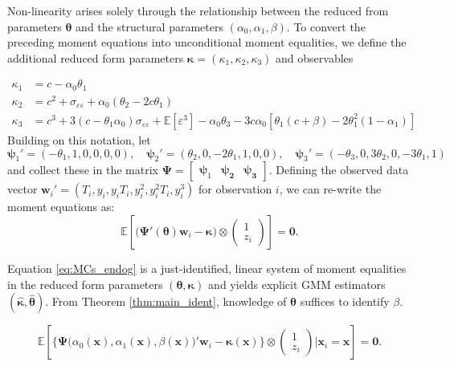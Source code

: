 Non-linearity arises solely through the relationship between the reduced from parameters $\boldsymbol{\theta}$ and the structural parameters $(\alpha_0, \alpha_1, \beta)$.
To convert the preceding moment equations into unconditional moment equalities, we define the additional reduced form parameters $\boldsymbol{\kappa} = (\kappa_1, \kappa_2, \kappa_3)$ and observables 

\begin{align*}
\kappa_1 &= c - \alpha_0 \theta_1\\
  \kappa_2 &= c^2 + \sigma_{\varepsilon\varepsilon} + \alpha_0 (\theta_2 - 2c \theta_1)\\
  \kappa_3 &= c^3 + 3\left( c - \theta_1 \alpha_0 \right) \sigma_{\varepsilon\varepsilon} + \mathbb{E}[\varepsilon^3] - \alpha_0 \theta_3 - 3 c \alpha_0 \left[ \theta_1 \left( c + \beta \right) - 2\theta_1^2 (1 - \alpha_1) \right]
\end{align*}
Building on this notation, let
\begin{equation}
  \boldsymbol{\psi}_1' = (-\theta_1, 1, 0, 0, 0, 0), \quad
  \boldsymbol{\psi}_2' = (\theta_2, 0, -2\theta_1, 1, 0, 0), \quad
  \boldsymbol{\psi}_3' = (-\theta_3, 0, 3\theta_2, 0, -3\theta_1, 1)
\end{equation}
and collect these in the matrix
$\boldsymbol{\Psi} = \left[
  \begin{array}{ccc}
    \boldsymbol{\psi}_1 & \boldsymbol{\psi_2} & \boldsymbol{\psi_3}
\end{array}\right]$.
Defining the observed data vector $\mathbf{w}_i' = (T_i, y_i, y_iT_i, y_i^2, y_i^2 T_i, y_i^3)$ for observation $i$, we can re-write the moment equations as:
\begin{equation}
\mathbb{E}\left[
  \big(\boldsymbol{\Psi}'(\boldsymbol{\theta})\mathbf{w}_i - \boldsymbol{\kappa}\big) \otimes 
\left(
\begin{array}{c}
  1 \\ z_i
\end{array}\right)
\right] = \mathbf{0}.
\end{equation}

Equation \ref{eq:MCs_endog} is a just-identified, linear system of moment equalities in the reduced form parameters $(\boldsymbol{\theta},\boldsymbol{\kappa})$ and yields explicit GMM estimators $(\widehat{\boldsymbol{\kappa}},\widehat{\boldsymbol{\theta}})$.
From Theorem \ref{thm:main_ident}, knowledge of $\boldsymbol{\theta}$ suffices to identify $\beta$.

\begin{equation}
\mathbb{E}\left[
  \bigg\{\boldsymbol{\Psi}\big(\alpha_0(\mathbf{x}), \alpha_1(\mathbf{x}), \beta(\mathbf{x})\big)' \mathbf{w}_i - \boldsymbol{\kappa}(\mathbf{x})\bigg\} \otimes 
\left(
\begin{array}{c}
  1 \\ z_i
\end{array}\right)\Bigg| \mathbf{x}_i = \boldsymbol{x}
\right] = \mathbf{0}.
\end{equation}

